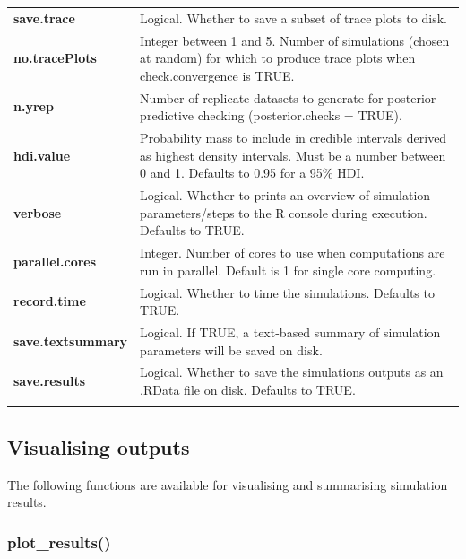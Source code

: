 \documentclass[
]{article}
\begin{document}
\begin{longtable}{>{\bfseries}l|>{\raggedright\arraybackslash}p{30em}}
save.trace & Logical. Whether to save a subset of trace plots to disk.\\
no.tracePlots & Integer between 1 and 5. Number of simulations (chosen at random) for which to produce trace plots when check.convergence is TRUE.\\
\addlinespace
n.yrep & Number of replicate datasets to generate for posterior predictive checking (posterior.checks = TRUE).\\
hdi.value & Probability mass to include in credible intervals derived as highest density intervals. Must be a number between 0 and 1. Defaults to 0.95 for a 95\% HDI.\\
verbose & Logical. Whether to prints an overview of simulation parameters/steps to the R console during execution. Defaults to TRUE.\\
parallel.cores & Integer. Number of cores to use when computations are run in parallel. Default is 1 for single core computing.\\
record.time & Logical. Whether to time the simulations. Defaults to TRUE.\\
\addlinespace
save.textsummary & Logical. If TRUE, a text-based summary of simulation parameters will be saved on disk.\\
save.results & Logical. Whether to save the simulations outputs as an .RData file on disk. Defaults to TRUE.\\*
\end{longtable}

\pagebreak
\subsection{Visualising outputs}

The following functions are available for visualising and summarising simulation results.

\subsubsection{plot\_results()}
\end{document}

